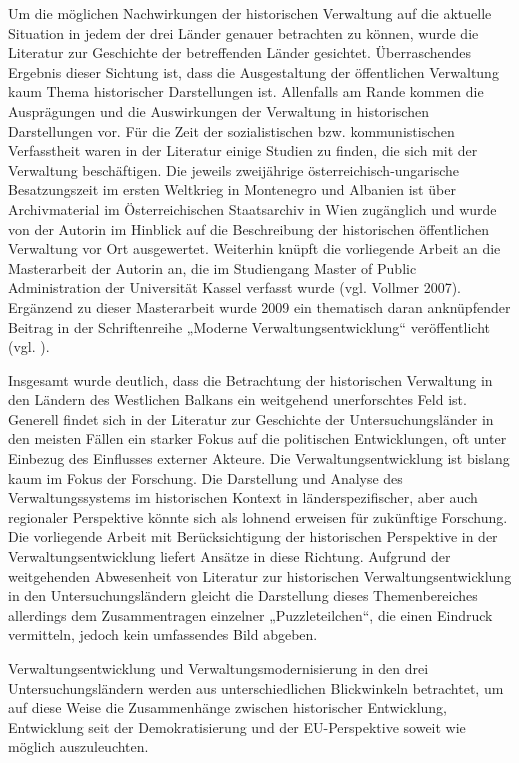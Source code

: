 \par
Um die möglichen Nachwirkungen der historischen Verwaltung auf die aktuelle Situation in jedem der drei Länder genauer betrachten zu können, wurde die Literatur zur Geschichte der betreffenden Länder gesichtet. Überraschendes Ergebnis dieser Sichtung ist, dass die Ausgestaltung der öffentlichen Verwaltung kaum Thema historischer Darstellungen ist. Allenfalls am Rande kommen die Ausprägungen und die Auswirkungen der Verwaltung in historischen Darstellungen vor. Für die Zeit der sozialistischen bzw. kommunistischen Verfasstheit waren in der Literatur einige Studien zu finden, die sich mit der Verwaltung beschäftigen. Die jeweils zweijährige österreichisch-ungarische Besatzungszeit im ersten Weltkrieg in Montenegro und Albanien ist über Archivmaterial im Österreichischen Staatsarchiv in Wien zugänglich und wurde von der Autorin im Hinblick auf die Beschreibung der historischen öffentlichen Verwaltung vor Ort ausgewertet. Weiterhin knüpft die vorliegende Arbeit an die Masterarbeit der Autorin an, die im Studiengang Master of Public Administration der Universität Kassel verfasst wurde (vgl. Vollmer 2007). Ergänzend zu dieser Masterarbeit wurde 2009 ein thematisch daran anknüpfender Beitrag in der Schriftenreihe „Moderne Verwaltungsentwicklung“ veröffentlicht (vgl. \cite{vollmer09}).
\par
Insgesamt wurde deutlich, dass die Betrachtung der historischen Verwaltung in den Ländern des Westlichen Balkans ein weitgehend unerforschtes Feld ist. Generell findet sich in der Literatur zur Geschichte der Untersuchungsländer in den meisten Fällen ein starker Fokus auf die politischen Entwicklungen, oft unter Einbezug des Einflusses externer Akteure. Die Verwaltungsentwicklung ist bislang kaum im Fokus der Forschung. Die Darstellung und Analyse des Verwaltungssystems im historischen Kontext in länderspezifischer, aber auch regionaler Perspektive könnte sich als lohnend erweisen für zukünftige Forschung. Die vorliegende Arbeit mit Berücksichtigung der historischen Perspektive in der Verwaltungsentwicklung liefert Ansätze in diese Richtung. Aufgrund der weitgehenden Abwesenheit von Literatur zur historischen Verwaltungsentwicklung in den Untersuchungsländern gleicht die Darstellung dieses Themenbereiches allerdings dem Zusammentragen einzelner „Puzzleteilchen“, die einen Eindruck vermitteln, jedoch kein umfassendes Bild abgeben.
\par
Verwaltungsentwicklung und Verwaltungsmodernisierung in den drei Untersuchungsländern werden aus unterschiedlichen Blickwinkeln betrachtet, um auf diese Weise die Zusammenhänge zwischen historischer Entwicklung, Entwicklung seit der Demokratisierung und der EU-Perspektive soweit wie möglich auszuleuchten.

